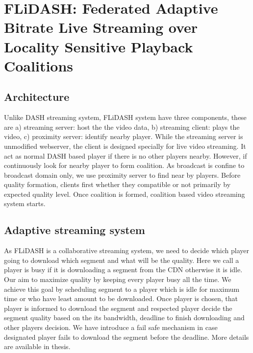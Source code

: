 \section{FLiDASH: Federated Adaptive Bitrate Live Streaming over Locality Sensitive Playback Coalitions}
\subsection{Architecture}
Unlike DASH streaming system, FLiDASH system have three components, these are a) streaming server: host the the video data, b) streaming client: plays the video, c) proximity server: identify nearby player. While the streaming server is unmodified webserver, the client is designed specially for live video streaming. It act as normal DASH based player if there is no other players nearby. However, if continuously look for nearby player to form coalition. As broadcast is confine to broadcast domain only, we use proximity server to find near by players. Before quality formation, clients first whether they compatible or not primarily by expected quality level. Once coalition is formed, coalition based video streaming system starts.
\subsection{Adaptive streaming system}
As FLiDASH is a collaborative streaming system, we need to decide which player going to download which segment and what will be the quality. Here we call a player is busy if it is downloading a segment from the CDN otherwise it is idle. Our aim to maximize quality by keeping every player busy all the time. We achieve this goal by scheduling segment to a player which is idle for maximum time or who have least amount to be downloaded. Once player is chosen, that player is informed to download the segment and respected player decide the segment quality based on the its bandwidth, deadline to finish downloading and other players decision. We have introduce a fail safe mechanism in case designated player fails to download the segment before the deadline. More details are available in thesis.
